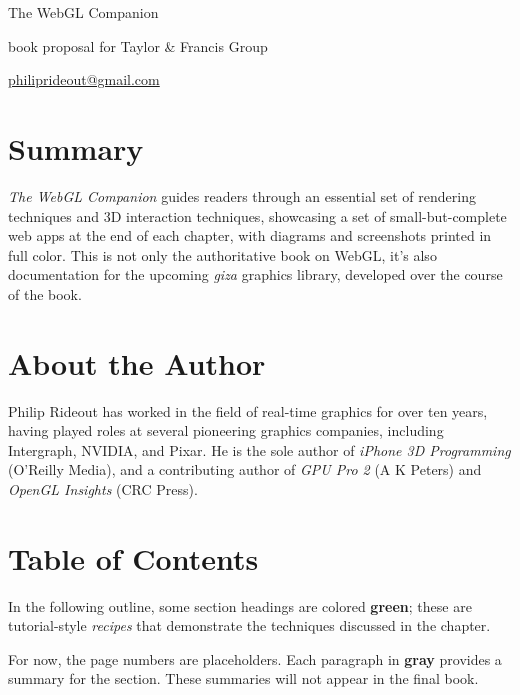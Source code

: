 \thispagestyle{empty}
\label{Proposal}
\LARGE

\noindent The WebGL Companion

\small

\vspace{0.25in}
\noindent book proposal for Taylor \& Francis Group

\noindent \href{mailto:philiprideout@gmail.com}{philiprideout@gmail.com}
\normalsize

\section*{Summary}
\emph{The WebGL Companion} guides readers through an essential set of rendering techniques and 3D interaction techniques, showcasing a set of small-but-complete web apps at the end of each chapter, with diagrams and screenshots printed in full color.  This is not only the authoritative book on WebGL, it's also documentation for the upcoming \emph{giza} graphics library, developed over the course of the book.

\section*{About the Author}

Philip Rideout has worked in the field of real-time graphics for over ten years, having played roles at several pioneering graphics companies, including Intergraph, NVIDIA, and Pixar.  He is the sole author of \emph{iPhone 3D Programming} (O'Reilly Media), and a contributing author of \emph{GPU Pro 2} (A K Peters) and \emph{OpenGL Insights} (CRC Press).

\section*{Table of Contents}


In the following outline, some section headings are colored \textbf{\textcolor{mygreen}{green}}; these are tutorial-style \emph{recipes} that demonstrate the techniques discussed in the chapter.


For now, the page numbers are placeholders.  Each paragraph in \textbf{\textcolor{mygray}{gray}} provides a summary for the section.   These summaries will not appear in the final book.

